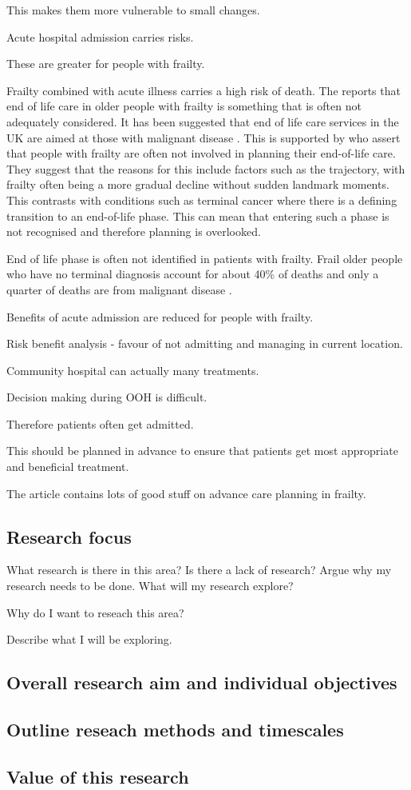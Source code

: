 \documentclass
[
	12pt,
	a4paper,
	oneside,
]{article}
\begin{document}
This makes them more vulnerable to small changes.

Acute hospital admission carries risks.

These are greater for people with frailty.

Frailty combined with acute illness carries a high risk of death. 
The \textcite{silver:12} reports that end of life care in older people with frailty
is something that is often not adequately considered. It has been suggested that 
end of life care services in the UK are aimed at those with malignant 
disease \parencite{sharp:13}.
This is supported by \textcite{oliver:14} who assert that people with frailty 
are often not involved in planning their 
end-of-life care. They suggest that the reasons for this include factors such as
the trajectory, with frailty often being a more gradual decline without sudden 
landmark moments. This contrasts with conditions such as terminal cancer where there 
is a defining transition to an end-of-life phase. This can mean that entering such a
phase is not recognised and therefore planning is overlooked. 


End of life phase is often not identified in patients with frailty. 
Frail older people who have no terminal diagnosis account for about 40\% of 
deaths and only a quarter of deaths are from malignant disease \parencite{sharp:13}.

Benefits of acute admission are reduced for people with frailty.

Risk benefit analysis - favour of not admitting and managing in current location.

Community hospital can actually many treatments.

Decision making during OOH is difficult.

Therefore patients often get admitted.

This should be planned in advance to ensure that patients get most appropriate 
and beneficial treatment. 

The article \textcite{sharp:13} contains lots of good
stuff on advance care planning in frailty.

\subsection{Research focus}
What research is there in this area? 
Is there a lack of research? 
Argue why my research needs to be done.
What will my research explore? 

Why do I want to reseach this area?

Describe what I will be exploring.

\subsection{Overall research aim and individual objectives}

\subsection{Outline reseach methods and timescales}

\subsection{Value of this research}

\clearpage
\printbibliography
\end{document}
